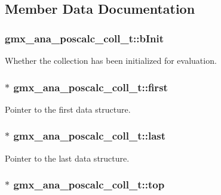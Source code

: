 \subsection{\-Member \-Data \-Documentation}
\hypertarget{structgmx__ana__poscalc__coll__t_a1f5bee1cfbe8cea23330e54b108aec2f}{
\subsubsection[{b\-Init}]{ {\bf gmx\-\_\-ana\-\_\-poscalc\-\_\-coll\-\_\-t\-::b\-Init}}}\label{structgmx__ana__poscalc__coll__t_a1f5bee1cfbe8cea23330e54b108aec2f}
\-Whether the collection has been initialized for evaluation. \hypertarget{structgmx__ana__poscalc__coll__t_a8c4874a7fb6c03f41f28e1296ebe5e1e}{
\subsubsection[{first}]{$\ast$ {\bf gmx\-\_\-ana\-\_\-poscalc\-\_\-coll\-\_\-t\-::first}}}\label{structgmx__ana__poscalc__coll__t_a8c4874a7fb6c03f41f28e1296ebe5e1e}
\-Pointer to the first data structure. \hypertarget{structgmx__ana__poscalc__coll__t_a4eb819a49cc7154f476c1cddc2de1d63}{
\subsubsection[{last}]{$\ast$ {\bf gmx\-\_\-ana\-\_\-poscalc\-\_\-coll\-\_\-t\-::last}}}\label{structgmx__ana__poscalc__coll__t_a4eb819a49cc7154f476c1cddc2de1d63}
\-Pointer to the last data structure. \hypertarget{structgmx__ana__poscalc__coll__t_a1b7c6734d2e656678b990719c01a84e1}{
\subsubsection[{top}]{$\ast$ {\bf gmx\-\_\-ana\-\_\-poscalc\-\_\-coll\-\_\-t\-::top}}}\label{structgmx__ana__poscalc__coll__t_a1b7c6734d2e656678b990719c01a84e1}


